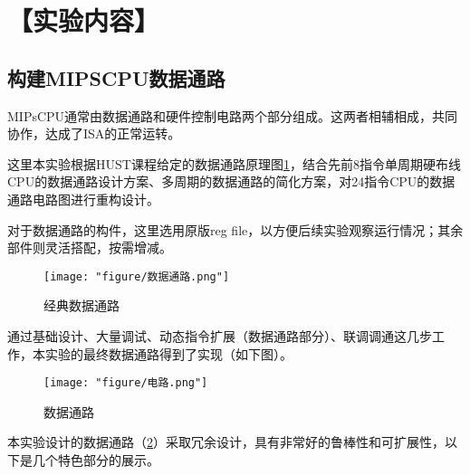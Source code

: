 \documentclass[withoutpreface]{cumcmthesis}
\begin{document}
\begin{abstract}
\begin{enumerate}
	\end{enumerate}



\subsection*{实验产出：}
\begin{enumerate}
	\item 自主设计电路图
	\item 头哥网通关
	\item 实验报告（\LaTeX{}）
	\item 支持材料
	\item \textbf{github | gitee}更新 请见\url{https://gitee.com/cslearnerer/AHU-CSHT}或\url{https://github.com/YUCHENYUXI/CPUDesign}
\end{enumerate}
\end{abstract}
\tableofcontents
\newpage

\section{【实验内容】}
\subsection{构建MIPSCPU数据通路}
MIPsCPU通常由数据通路和硬件控制电路两个部分组成。这两者相辅相成，共同协作，达成了ISA的正常运转。

这里本实验根据HUST课程给定的数据通路原理图\cref{fig:dataroute}，结合先前8指令单周期硬布线CPU的数据通路设计方案、多周期的数据通路的简化方案，对24指令CPU的数据通路电路图进行重构设计。

对于数据通路的构件，这里选用原版reg file，以方便后续实验观察运行情况；其余部件则灵活搭配，按需增减。
\begin{figure}[!h]
	\centering
	\texttt{[image: "figure/数据通路.png"]}
	\caption{经典数据通路}
	\label{fig:dataroute}
\end{figure}

通过基础设计、大量调试、动态指令扩展（数据通路部分）、联调调通这几步工作，本实验的最终数据通路得到了实现（如下图）。
\begin{figure}[!h]
	\centering
	\texttt{[image: "figure/电路.png"]}
	\caption{数据通路}
	\label{fig:cirdesign}
\end{figure}

本实验设计的数据通路（\cref{fig:cirdesign}）采取冗余设计，具有非常好的鲁棒性和可扩展性，以下是几个特色部分的展示。
\end{document}
